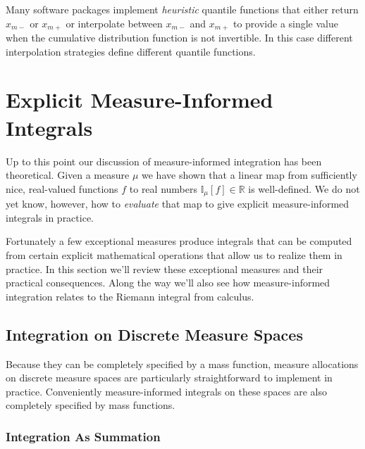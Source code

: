 \documentclass[
  letterpaper,
  DIV=11,
  numbers=noendperiod]{scrartcl}
\begin{document}
Many software packages implement \emph{heuristic} quantile functions
that either return \(x_{m-}\) or \(x_{m+}\) or interpolate between
\(x_{m-}\) and \(x_{m+}\) to provide a single value when the cumulative
distribution function is not invertible. In this case different
interpolation strategies define different quantile functions.

\hypertarget{explicit-measure-informed-integrals}{%
\section{Explicit Measure-Informed
Integrals}\label{explicit-measure-informed-integrals}}

Up to this point our discussion of measure-informed integration has been
theoretical. Given a measure \(\mu\) we have shown that a linear map
from sufficiently nice, real-valued functions \(f\) to real numbers
\(\mathbb{I}_{\mu}[f] \in \mathbb{R}\) is well-defined. We do not yet
know, however, how to \emph{evaluate} that map to give explicit
measure-informed integrals in practice.

Fortunately a few exceptional measures produce integrals that can be
computed from certain explicit mathematical operations that allow us to
realize them in practice. In this section we'll review these exceptional
measures and their practical consequences. Along the way we'll also see
how measure-informed integration relates to the Riemann integral from
calculus.

\hypertarget{integration-on-discrete-measure-spaces}{%
\subsection{Integration on Discrete Measure
Spaces}\label{integration-on-discrete-measure-spaces}}

Because they can be completely specified by a mass function, measure
allocations on discrete measure spaces are particularly straightforward
to implement in practice. Conveniently measure-informed integrals on
these spaces are also completely specified by mass functions.

\hypertarget{integration-as-summation}{%
\subsubsection{Integration As
Summation}\label{integration-as-summation}}
\end{document}
